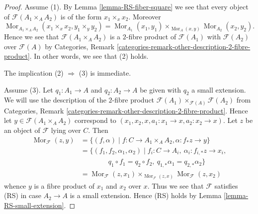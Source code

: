 \documentclass[10pt,a4paper]{amsart}
\theoremstyle{plain}
\theoremstyle{definition}
\theoremstyle{remark}
\numberwithin{equation}{subsection}
\def\Mor{\mathop{\mathrm{Mor}}\nolimits}
\begin{document}
\begin{proof}
Assume (1). By
Lemma \ref{lemma-RS-fiber-square}
we see that every object of $\mathcal{F}(A_1 \times_A A_2)$
is of the form $x_1 \times_x x_2$. Moreover
$$
\Mor_{A_1 \times_A A_2}(x_1 \times_x x_2, y_1 \times_y y_2) =
\Mor_{A_1}(x_1, y_1) \times_{\Mor_A(x, y)}
\Mor_{A_2}(x_2, y_2).
$$
Hence we see that $\mathcal{F}(A_1 \times_A A_2)$ is a $2$-fibre product
of $\mathcal{F}(A_1)$ with $\mathcal{F}(A_2)$ over $\mathcal{F}(A)$ by
Categories, Remark \ref{categories-remark-other-description-2-fibre-product}.
In other words, we see that (2) holds.

\medskip\noindent
The implication (2) $\Rightarrow$ (3) is immediate.

\medskip\noindent
Assume (3). Let $q_1 : A_1 \to A$ and $q_2 : A_2 \to A$ be given with
$q_2$ a small extension. We will use the description of the $2$-fibre product
$\mathcal{F}(A_1) \times_{\mathcal{F}(A)} \mathcal{F}(A_2)$ from
Categories, Remark \ref{categories-remark-other-description-2-fibre-product}.
Hence let $y \in \mathcal{F}(A_1 \times_A A_2)$ correspond to
$(x_1, x_2, x, a_1 : x_1 \to x, a_2 : x_2 \to x)$.
Let $z$ be an object of $\mathcal{F}$ lying over $C$. Then
\begin{align*}
\Mor_\mathcal{F}(z, y) & =
\{(f, \alpha) \mid f : C \to A_1 \times_A A_2,
\alpha : f_*z \to y\} \\
& = \{(f_1, f_2, \alpha_1, \alpha_2) \mid
f_i : C \to A_i, \ \alpha_i : f_{i, *}z \to x_i, \\
& \quad\quad\quad\quad
q_1 \circ f_1 = q_2 \circ f_2, \ q_{1, *} \alpha_1 = q_{2, *}\alpha_2\} \\
& =
\Mor_\mathcal{F}(z, x_1) \times_{\Mor_\mathcal{F}(z, x)}
\Mor_\mathcal{F}(z, x_2)
\end{align*}
whence $y$ is a fibre product of $x_1$ and $x_2$ over $x$. Thus we see
that $\mathcal{F}$ satisfies (RS) in case $A_2 \to A$ is a small extension.
Hence (RS) holds by
Lemma \ref{lemma-RS-small-extension}.
\end{proof}
\end{document}
